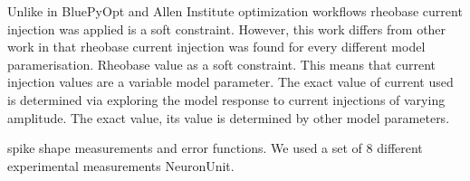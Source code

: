 Unlike in BluePyOpt \cite{bluepyopt} and Allen Institute optimization workflows \cite{gouwens} rheobase current injection was applied is a soft constraint. However, this work differs from other work in that rheobase current injection was found for every different model paramerisation.
Rheobase value as a soft constraint. This means that current injection values are a variable model parameter. The exact value of current used is determined via exploring the model response to current injections of varying amplitude. The exact value, its value is determined by other model parameters.

spike shape measurements and error functions. We used a set of 8 different experimental measurements NeuronUnit.


